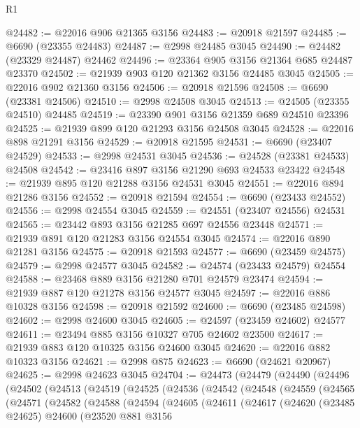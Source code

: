 \begin{lexlean}{R1}
\begin{coremodule}
@24482 := @22016 @906 @21365 @3156
@24483 := @20918 @21597
@24485 := @6690 (@23355 @24483)
@24487 := @2998 @24485 @3045
@24490 := @24482 (@23329 @24487) @24462
@24496 := @23364 @905 @3156 @21364 @685 @24487 @23370
@24502 := @21939 @903 @120 @21362 @3156 @24485 @3045
@24505 := @22016 @902 @21360 @3156
@24506 := @20918 @21596
@24508 := @6690 (@23381 @24506)
@24510 := @2998 @24508 @3045
@24513 := @24505 (@23355 @24510) @24485
@24519 := @23390 @901 @3156 @21359 @689 @24510 @23396
@24525 := @21939 @899 @120 @21293 @3156 @24508 @3045
@24528 := @22016 @898 @21291 @3156
@24529 := @20918 @21595
@24531 := @6690 (@23407 @24529)
@24533 := @2998 @24531 @3045
@24536 := @24528 (@23381 @24533) @24508
@24542 := @23416 @897 @3156 @21290 @693 @24533 @23422
@24548 := @21939 @895 @120 @21288 @3156 @24531 @3045
@24551 := @22016 @894 @21286 @3156
@24552 := @20918 @21594
@24554 := @6690 (@23433 @24552)
@24556 := @2998 @24554 @3045
@24559 := @24551 (@23407 @24556) @24531
@24565 := @23442 @893 @3156 @21285 @697 @24556 @23448
@24571 := @21939 @891 @120 @21283 @3156 @24554 @3045
@24574 := @22016 @890 @21281 @3156
@24575 := @20918 @21593
@24577 := @6690 (@23459 @24575)
@24579 := @2998 @24577 @3045
@24582 := @24574 (@23433 @24579) @24554
@24588 := @23468 @889 @3156 @21280 @701 @24579 @23474
@24594 := @21939 @887 @120 @21278 @3156 @24577 @3045
@24597 := @22016 @886 @10328 @3156
@24598 := @20918 @21592
@24600 := @6690 (@23485 @24598)
@24602 := @2998 @24600 @3045
@24605 := @24597 (@23459 @24602) @24577
@24611 := @23494 @885 @3156 @10327 @705 @24602 @23500
@24617 := @21939 @883 @120 @10325 @3156 @24600 @3045
@24620 := @22016 @882 @10323 @3156
@24621 := @2998 @875
@24623 := @6690 (@24621 @20967)
@24625 := @2998 @24623 @3045
@24704 := @24473
    (@24479
      (@24490
        (@24496
          (@24502
            (@24513
              (@24519
                (@24525
                  (@24536
                    (@24542
                      (@24548
                        (@24559
                          (@24565
                            (@24571
                              (@24582
                                (@24588
                                  (@24594
                                    (@24605
                                      (@24611
                                        (@24617
                                          (@24620
                                            (@23485 @24625)
                                            @24600
                                            (@23520
                                              @881
                                              @3156

\end{coremodule}
\end{lexlean}
